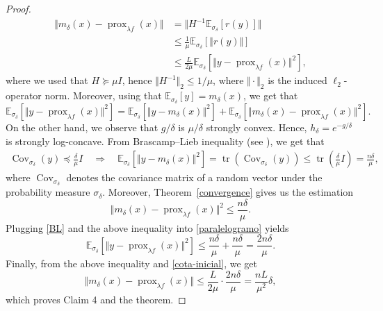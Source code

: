 \documentclass[11pt]{amsart}
\newcommand{\1}{\mathds{1}}
\theoremstyle{definition}
\theoremstyle{remark}
\theoremstyle{definition}
\begin{document}
\begin{proof}
\begin{equation}
\begin{aligned}
\Vert m_{\delta}(x)-\operatorname{prox}_{\lambda f}(x)\Vert &=\Vert H^{-1} \mathbb{E}_{\sigma_{\delta}}[r(y)]\Vert\\
&\leq \frac{1}{\mu}\mathbb{E}_{\sigma_{\delta}}\left[ \Vert r(y)\Vert \right] \\
&\leq \frac{L}{2\mu}\mathbb{E}_{\sigma_{\delta}}[\Vert y-\operatorname{prox}_{\lambda f}(x)\Vert^2],
    \end{aligned}
\end{equation}
where we used that $H\succcurlyeq \mu I$, hence $\Vert H^{-1}\Vert_2 \leq 1/\mu$, where $\Vert \cdot \Vert_2$ is the  induced $\ell_2$-operator norm.  Moreover, using that $\mathbb{E}_{\sigma_{\delta}}[y]=m_{\delta}(x)$, we get that
\begin{equation}\label{paralelogramo}
   \mathbb{E}_{\sigma_{\delta}}[\Vert y-\operatorname{prox}_{\lambda f}(x)\Vert^2]=\mathbb{E}_{\sigma_{\delta}}[\Vert y-m_{\delta}(x)\Vert^2]+\mathbb{E}_{\sigma_{\delta}}[\Vert m_{\delta}(x)-\operatorname{prox}_{\lambda f}(x)\Vert^2].
\end{equation}
On the other hand, we observe that $g/\delta$ is $\mu/\delta$ strongly convex. Hence, $h_{\delta}=e^{-g/\delta}$ is strongly log-concave. From Brascamp–Lieb inequality (see \cite[Theorem~4.1]{MR450480}), we get that {\small 
\begin{equation}\label{BL}
\begin{aligned}
\operatorname{Cov}_{\sigma_{\delta}}(y)\preceq \frac{\delta}{\mu}I \quad \Rightarrow  \quad  \mathbb{E}_{\sigma_{\delta}}[\Vert y-m_{\delta}(x)\Vert^2]=\operatorname{tr}\left(\operatorname{Cov}_{\sigma_{\delta}}(y)\right)\leq \operatorname{tr}\left(\frac{\delta}{\mu}I\right)=\frac{n\delta}{\mu},
\end{aligned}
\end{equation}}
where $\operatorname{Cov}_{\sigma_\delta}$ denotes the covariance matrix of a random vector under the probability measure $\sigma_\delta$. Moreover, Theorem~\ref{convergence} gives us the estimation
\begin{equation*}
\Vert m_{\delta}(x)-\operatorname{prox}_{\lambda f}(x)\Vert^2 \leq \frac{n\delta}{\mu}.
\end{equation*}
Plugging \eqref{BL} and the above inequality  into \eqref{paralelogramo} yields
\begin{equation*}
    \mathbb{E}_{\sigma_{\delta}}[\Vert y-\operatorname{prox}_{\lambda f}(x)\Vert^2]\leq \frac{n\delta}{\mu}+\frac{n\delta}{\mu}=\frac{2n\delta}{\mu}.
\end{equation*}
Finally, from the above inequality and \eqref{cota-inicial}, we get
$$
\Vert m_{\delta}(x)-\operatorname{prox}_{\lambda f}(x)\Vert \leq \frac{L}{2\mu}\cdot \frac{2n\delta}{\mu}=\frac{nL}{\mu^2}\delta,
$$
which proves Claim  4 and the theorem.
\end{proof}
\end{document}

